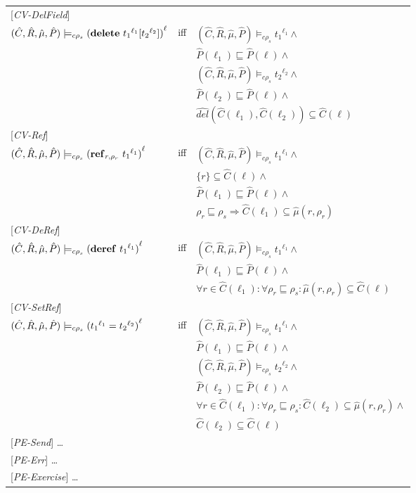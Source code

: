 \documentclass[[12pt,a4paper,twoside,openrigh]{article}
\newcommand{\Cat}[0]{\hat{C}}
\newcommand{\muat}[0]{\hat{\mu}}
\newcommand{\Rat}[0]{\hat{R}}
\newcommand{\Pat}[0]{\hat{P}}
\newcommand{\cenvs}{(\Cat,\Rat,\muat,\Pat)}
\newcommand{\ccest}[1]{\cenvs \models_{c \rho_s} #1}
\newcommand{\ccestl}[1]{\cenvs \models_{c \rho_s} {(#1)}^{\ell}}
\newcommand{\lbt}[1]{{t_#1}^{\ell_#1}}
\begin{document}
\begin{tabular} {l l l}
{[\textit{CV-DelField}]}\\
$\ccestl {\delete {\lbt 1} {\lbt 2}} $& iff &$ \ccest {\lbt 1} \wedge $\\
&& $\Pat(\ell_1) \sqsubseteq \Pat(\ell) \wedge$ \\
&& $ \ccest {\lbt 2} \wedge $ \\
&& $\Pat(\ell_2) \sqsubseteq \Pat(\ell) \wedge$ \\
&& $\widehat{del} (\Cat(\ell_1), \Cat(\ell_2)) \subseteq \Cat(\ell)$\\
{[\textit{CV-Ref}]}\\
$ \ccestl {\newref {r,\rho_r} {\lbt 1}} $& iff &$ \ccest {\lbt 1} \wedge $\\
&& $ \{r\} \subseteq \Cat(\ell) \wedge$ \\
&& $ \Pat(\ell_1) \sqsubseteq \Pat(\ell) \wedge$ \\
&& $ \rho_r \sqsubseteq \rho_s \Rightarrow \Cat(\ell_1) \subseteq \muat(r, \rho_r) $ \\
{[\textit{CV-DeRef}]}\\
$\ccestl {\deref {\lbt 1}} $& iff &$ \ccest {\lbt 1}\wedge $\\
&& $\Pat(\ell_1) \sqsubseteq \Pat(\ell) \wedge$ \\
&& $\forall r \in \Cat(\ell_1) : \forall \rho_r \sqsubseteq \rho_s : \muat(r, \rho_r) \subseteq \Cat(\ell)$ \\
{[\textit{CV-SetRef}]}\\
$\ccestl {\setref {\lbt 1} {\lbt 2}} $& iff &$ \ccest {\lbt 1} \wedge $\\
&& $ \Pat(\ell_1) \sqsubseteq \Pat(\ell) \wedge $ \\
&& $ \ccest {\lbt 2} \wedge $ \\
&& $ \Pat(\ell_2) \sqsubseteq \Pat(\ell) \wedge $ \\
&& $ \forall r \in \Cat(\ell_1) : \forall \rho_r \sqsubseteq \rho_s : \Cat(\ell_2) \subseteq \muat(r, \rho_r) \wedge$ \\
&& $ \Cat(\ell_2) \subseteq \Cat(\ell) $ \\
{[\textit{PE-Send}]} \dots \\
{[\textit{PE-Err}]} \dots \\
{[\textit{PE-Exercise}]} \dots \\
\end{tabular}
\end{document}
